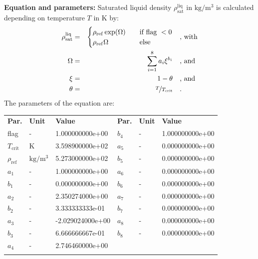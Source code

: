 \textbf{Equation and parameters:}
\newline
%
Saturated liquid density $\rho_\mathrm{sat}^\mathrm{liq}$ in $\si{\kilogram\per\cubic\meter}$ is calculated depending on temperature $T$ in $\si{\kelvin}$ by:
%
\begin{equation*}
\begin{split}
\rho_\mathrm{sat}^\mathrm{liq} &=& \begin{cases} \rho_\mathrm{ref} \exp(\Omega) & \quad \text{if flag } < 0 \\ \rho_\mathrm{ref} \Omega & \quad \text{else} \end{cases} & \quad\text{, with} \\
\Omega &=& \sum_{i=1}^{8} a_i \xi^{b_i} & \quad\text{, and} \\
\xi &=& 1 - \theta & \quad\text{, and} \\
\theta &=& \nicefrac{T}{T_\mathrm{crit}} & \quad\text{.}
\end{split}
\end{equation*}
%
The parameters of the equation are:
%
\begin{longtable}[l]{lll|lll}
\toprule
\addlinespace
\textbf{Par.} & \textbf{Unit} & \textbf{Value} &	\textbf{Par.} & \textbf{Unit} & \textbf{Value} \\
\addlinespace
\midrule
\endhead

\bottomrule
\endfoot
\bottomrule
\endlastfoot
\addlinespace

flag & - & 1.000000000e+00 & $b_4$ & - & 1.000000000e+00 \\
$T_\mathrm{crit}$ & $\si{\kelvin}$ & 3.598900000e+02 & $a_5$ & - & 0.000000000e+00 \\
$\rho_\mathrm{ref}$ & $\si{\kilogram\per\cubic\meter}$ & 5.273000000e+02 & $b_5$ & - & 0.000000000e+00 \\
$a_1$ & - & 1.000000000e+00 & $a_6$ & - & 0.000000000e+00 \\
$b_1$ & - & 0.000000000e+00 & $b_6$ & - & 0.000000000e+00 \\
$a_2$ & - & 2.350274000e+00 & $a_7$ & - & 0.000000000e+00 \\
$b_2$ & - & 3.333333333e-01 & $b_7$ & - & 0.000000000e+00 \\
$a_3$ & - & -2.029024000e+00 & $a_8$ & - & 0.000000000e+00 \\
$b_3$ & - & 6.666666667e-01 & $b_8$ & - & 0.000000000e+00 \\
$a_4$ & - & 2.746460000e+00 & & & \\

\addlinespace\end{longtable}

